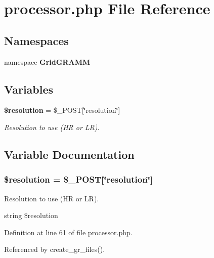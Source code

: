 \section{processor.php File Reference}
\label{processor_8php}
\subsection*{Namespaces}
\begin{CompactItemize}
\item 
namespace {\bf Grid\-GRAMM}
\end{CompactItemize}
\subsection*{Variables}
\begin{CompactItemize}
\item 
{\bf \$resolution} = \$\_\-POST[\char`\"{}resolution\char`\"{}]
\begin{CompactList}\small\item\em Resolution to use (HR or LR). \item\end{CompactList}\end{CompactItemize}


\subsection{Variable Documentation}
\subsubsection{\setlength{\rightskip}{0pt plus 5cm}\$resolution = \$\_\-POST[\char`\"{}resolution\char`\"{}]}\label{processor_8php_a0}


Resolution to use (HR or LR). 

string \$resolution 

Definition at line 61 of file processor.php.

Referenced by create\_\-gr\_\-files().